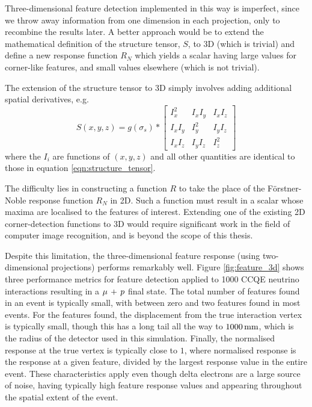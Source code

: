 Three-dimensional feature detection implemented in this way is imperfect, since we throw away information from one dimension in each projection, only to recombine the results later. A better approach would be to extend the mathematical definition of the structure tensor, $S$, to 3D (which is trivial) and define a new response function $R_N$ which yields a scalar having large values for corner-like features, and small values elsewhere (which is not trivial).

The extension of the structure tensor to 3D simply involves adding additional spatial derivatives, e.g.
\begin{equation}\label{eqn:structure_tensor_3d}
    S(x,y,z) = g(\sigma_s) \ast \left[ \begin{array}{ccc} I_x^2 & I_x I_y & I_x I_z \\ I_x I_y & I_y^2 & I_y I_z \\ I_x I_z & I_y I_z & I_z^2\end{array} \right]
\end{equation}
where the $I_{i}$ are functions of $(x,y,z)$ and all other quantities are identical to those in equation \eqref{eqn:structure_tensor}.

The difficulty lies in constructing a function $R$ to take the place of the F\"orstner-Noble response function $R_N$ in 2D. Such a function must result in a scalar whose maxima are localised to the features of interest. Extending one of the existing 2D corner-detection functions to 3D would require significant work in the field of computer image recognition, and is beyond the scope of this thesis.

Despite this limitation, the three-dimensional feature response (using two-dimensional projections) performs remarkably well. Figure \ref{fig:feature_3d} shows three performance metrics for feature detection applied to 1000 \ac{CCQE} neutrino interactions resulting in a $\mu\,+\,p$ final state. The total number of features found in an event is typically small, with between zero and two features found in most events. For the features found, the displacement from the true interaction vertex is typically small, though this has a long tail all the way to $1000\,\mathrm{mm}$, which is the radius of the detector used in this simulation. Finally, the normalised response at the true vertex is typically close to $1$, where normalised response is the response at a given feature, divided by the largest response value in the entire event. These characteristics apply even though delta electrons are a large source of noise, having typically high feature response values and appearing throughout the spatial extent of the event.

